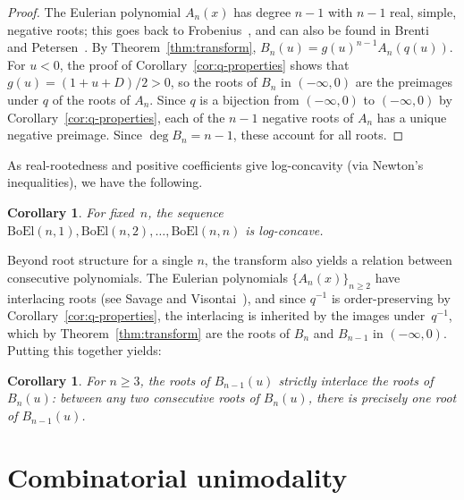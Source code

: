 \documentclass[10pt]{article}
\theoremstyle{plain}
\newtheorem{corollary}[theorem]{Corollary}
\newcommand{\boel}{\mathrm{BoEl}}
\begin{document}
\begin{proof}
The Eulerian polynomial $A_n(x)$ has degree $n-1$ with $n-1$ real, simple, negative roots; this goes back to Frobenius~\cite{frobenius:uber-die-bernou:}, and can also be found in Brenti~\cite{brenti:unimodal-log-co:} and Petersen~\cite{petersen:eulerian-number:}. By Theorem~\ref{thm:transform}, $B_n(u) = g(u)^{n-1} A_n(q(u))$. For $u < 0$, the proof of Corollary~\ref{cor:q-properties} shows that $g(u) = (1+u+D)/2 > 0$, so the roots of $B_n$ in $(-\infty, 0)$ are the preimages under $q$ of the roots of $A_n$. Since $q$ is a bijection from $(-\infty, 0)$ to $(-\infty, 0)$ by Corollary~\ref{cor:q-properties}, each of the $n-1$ negative roots of $A_n$ has a unique negative preimage. Since $\deg B_n = n-1$, these account for all roots.
\end{proof}

As real-rootedness and positive coefficients give log-concavity (via Newton's inequalities), we have the following.

\begin{corollary}
\label{cor:logconcave}
For fixed~$n$, the sequence $\boel(n,1), \boel(n,2), \ldots, \boel(n,n)$ is log-concave.
\end{corollary}

Beyond root structure for a single $n$, the transform also yields a relation between consecutive polynomials. The Eulerian polynomials $\{A_n(x)\}_{n \geq 2}$ have interlacing roots (see Savage and Visontai~\cite{savage:the-s-eulerian-:}), and since $q^{-1}$ is order-preserving by Corollary~\ref{cor:q-properties}, the interlacing is inherited by the images under~$q^{-1}$, which by Theorem~\ref{thm:transform} are the roots of $B_n$ and $B_{n-1}$ in $(-\infty, 0)$. Putting this together yields:

\begin{corollary}
\label{cor:interlacing}
For $n \geq 3$, the roots of $B_{n-1}(u)$ strictly interlace the roots of $B_n(u)$: between any two consecutive roots of $B_n(u)$, there is precisely one root of $B_{n-1}(u)$.
\end{corollary}


\section{Combinatorial unimodality}
\label{sec:unimodal}
\end{document}
